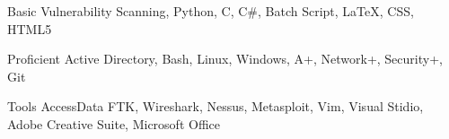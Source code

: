 

\begin{cvhonors}

  \cvhonor
    {Basic} %
    {Vulnerability Scanning, Python, C, C\#, Batch Script, \LaTeX, CSS, HTML5} %

  \cvhonor
    {Proficient} %
    {Active Directory, Bash, Linux, Windows, A+, Network+, Security+, Git} %

  \cvhonor
    {Tools} %
    {AccessData FTK, Wireshark, Nessus, Metasploit, Vim, Visual Stidio, Adobe Creative Suite, Microsoft Office} %


\end{cvhonors}